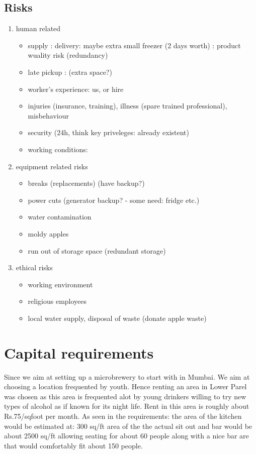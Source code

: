 \documentclass{article}
\begin{document}
  \subsection{Risks}
  \begin{enumerate}
  \item human related
    \begin{itemize}
    \item supply : delivery: maybe extra small freezer (2 days worth) 
              : product wuality risk (redundancy)

    \item late pickup : (extra space?)
    \item worker's experience: us, or hire
    \item injuries (insurance, training),  illness (spare trained professional), misbehaviour
    \item security (24h, think key priveleges: already existent)
    \item working conditions: 
    \end{itemize}
  \item equipment related risks
    \begin{itemize}
    \item breaks (replacements) (have backup?)
    \item power cuts (generator backup? - some need: fridge etc.)
    \item water contamination 
    \item moldy apples
    \item run out of storage space (redundant storage)
    \end{itemize}

  \item ethical risks
    \begin{itemize}
    \item working environment
    \item religious employees
    \item local water supply, disposal of waste (donate apple waste)
    \end{itemize}
  \end{enumerate}

\section{Capital requirements}

Since we aim at setting up a microbrewery to start with in Mumbai. We aim at choosing a location frequented by youth.
Hence renting an area in Lower Parel was chosen as this area is frequented alot by young drinkers willing to try new types of alcohol as if known for its night life.
Rent in this area is roughly about Rs.75/sqfoot per month.
As seen in the requirements:
the area of the kitchen would be estimated at: 300 sq/ft
area of the the actual sit out and bar would be about 2500 sq/ft allowing seating for about 60 people along with a nice bar are that would comfortably fit about 150 people.
\end{document}
